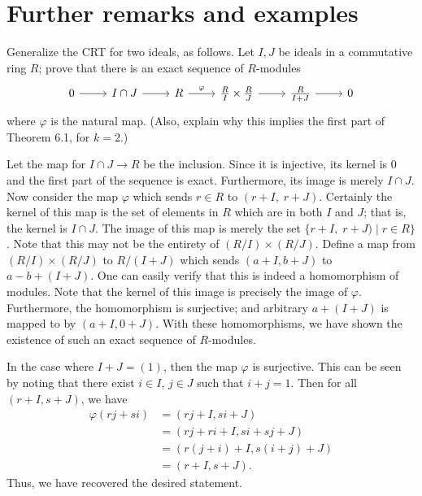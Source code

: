 \documentclass[../../master.tex]{subfiles}
\begin{document}
\section{Further remarks and examples}

\begin{problem}
    Generalize the CRT for two ideals, as follows.
    Let $I, J$ be ideals in a commutative ring $R$; prove that there is an exact sequence of $R$-modules
    \[
        \begin{tikzcd}
                0 & {I \cap J} & R & {\frac{R}{I} \times \frac{R}{J}} & {\frac{R}{I + J}} & 0
                \arrow[from=1-1, to=1-2]
                \arrow[from=1-2, to=1-3]
                \arrow["\varphi", from=1-3, to=1-4]
                \arrow[from=1-4, to=1-5]
                \arrow[from=1-5, to=1-6]
        \end{tikzcd}
    \]
    where $\varphi$ is the natural map. 
    (Also, explain why this implies the first part of Theorem 6.1, for $k = 2$.)
\end{problem}

\begin{solution}
    Let the map for $I \cap J \to R$ be the inclusion.
    Since it is injective, its kernel is 0 and the first part of the sequence is exact.
    Furthermore, its image is merely $I \cap J$.
    Now consider the map $\varphi$ which sends $r \in R$ to $(r + I, \; r + J)$.
    Certainly the kernel of this map is the set of elements in $R$ which are in both $I$ and $J$;
    that is, the kernel is $I \cap J$.
    The image of this map is merely the set $\{r + I, \; r + J) \mid r \in R\}$.
    Note that this may not be the entirety of $(R / I) \times (R / J)$.
    Define a map from $(R / I) \times (R / J)$ to $R / (I + J)$ which sends $(a + I, b + J)$ to $a - b + (I + J)$.
    One can easily verify that this is indeed a homomorphism of modules.
    Note that the kernel of this image is precisely the image of $\varphi$.
    Furthermore, the homomorphism is surjective;
    and arbitrary $a + (I + J)$ is mapped to by $(a + I, 0 + J)$.
    With these homomorphisms, we have shown the existence of such an exact sequence of $R$-modules.

    In the case where $I + J = (1)$, then the map $\varphi$ is surjective.
    This can be seen by noting that there exist $i \in I$, $j \in J$ such that $i + j = 1$.
    Then for all $(r + I, s + J)$, we have
    \begin{align*}
        \varphi(rj + si) &= (rj + I, si + J) \\
                   &= (rj + ri + I, si + sj + J) \\
                   &= (r(j + i) + I, s(i + j) + J) \\
                   &= (r + I, s + J).
    \end{align*}
    Thus, we have recovered the desired statement.
\end{solution}
\end{document}
